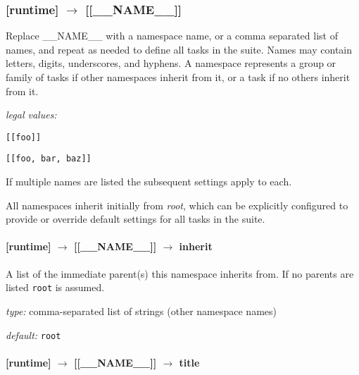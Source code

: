 \subsubsection[{[[}\_\_NAME\_\_{]]}]{[runtime] $\rightarrow$ [[\_\_NAME\_\_]]}

Replace \_\_NAME\_\_ with a namespace name, or a comma separated list of
names, and repeat as needed to define all tasks in the suite. Names may
contain letters, digits, underscores, and hyphens. A namespace
represents a group or family of tasks if other namespaces inherit from
it, or a task if no others inherit from it.


\begin{myitemize}
\item {\em legal values:} 
    \begin{myitemize}
        \item \lstinline=[[foo]]=
        \item \lstinline=[[foo, bar, baz]]=
    \end{myitemize}
\end{myitemize}

If multiple names are listed the subsequent settings apply to each. 

All namespaces inherit initially from {\em root}, which can be
explicitly configured to provide or override default settings
for all tasks in the suite.

\paragraph[inherit]{[runtime] $\rightarrow$ [[\_\_NAME\_\_]] $\rightarrow$ inherit}

A list of the immediate parent(s) this namespace inherits from. If no
parents are listed \lstinline=root= is assumed.

\begin{myitemize}
\item {\em type:} comma-separated list of strings (other namespace names)
\item {\em default:} \lstinline=root=
\end{myitemize}

\paragraph[title]{[runtime] $\rightarrow$ [[\_\_NAME\_\_]] $\rightarrow$ title}

